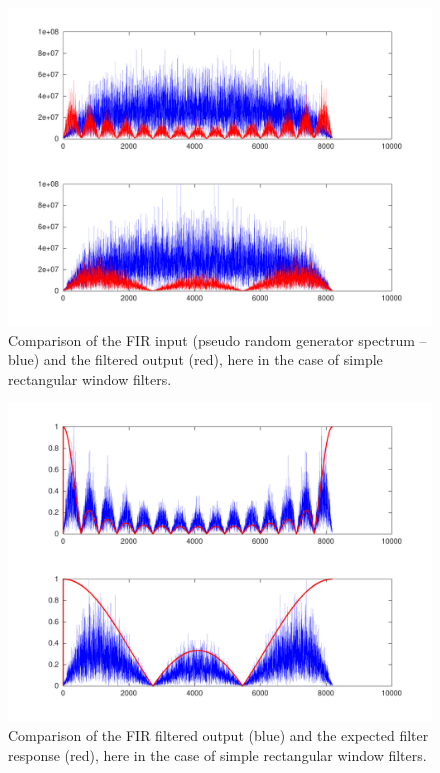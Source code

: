 \documentclass[12pt,oneside]{article}
\begin{document}
\begin{figure}[h!tb]
\begin{center}
\includegraphics[width=.70\linewidth]{carac_fir2.pdf}
\end{center}
\caption{Comparison of the FIR input (pseudo random generator spectrum -- blue)
and the filtered output (red), here in the case of simple rectangular window 
filters.}
\label{fir2}
\end{figure}

\begin{figure}[h!tb]
\begin{center}
\includegraphics[width=.70\linewidth]{carac_fir1.pdf}
\end{center}
\caption{Comparison of the FIR filtered output (blue) and the expected filter
response (red), here in the case of simple rectangular window filters.}
\label{fir1}
\end{figure}
\end{document}
